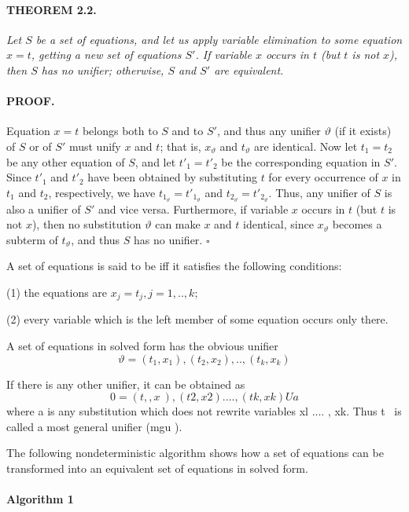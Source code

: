 \paragraph{THEOREM 2.2.} \textit{Let $S$ be a set of equations, and let us apply
variable elimination to some equation $x = t$, getting a new set of equations
$S'$. If variable $x$ occurs in $t$ (but $t$ is not $x$), then $S$ has no
unifier; otherwise, $S$ and $S'$ are equivalent.}

\paragraph{PROOF.} Equation $x = t$ belongs both to $S$ and to $S'$, and thus
any unifier $\vartheta$ (if it exists) of $S$ or of $S'$ must unify $x$ and $t$;
that is, $x_\vartheta$ and $t_\vartheta$ are identical. Now let $t_1 = t_2$ be
any other equation of $S$, and let $t'_1 = t'_2$ be the corresponding equation
in $S'$. Since $t'_1$ and $t'_2$ have been obtained by substituting $t$ for
every occurrence of $x$ in $t_1$ and $t_2$, respectively, we have
$t_{1_\vartheta}=t'_{1_\vartheta}$ and $t_{2_\vartheta}=t'_{2_\vartheta}$. Thus,
any unifier of $S$ is also a unifier of $S'$ and vice versa. Furthermore, if
variable $x$ occurs in $t$ (but $t$ is not $x$), then no substitution
$\vartheta$ can make $x$ and $t$ identical, since $x_\vartheta$ becomes a
subterm of $t_\vartheta$, and thus $S$ has no unifier. $\square$

A set of equations is said to be  iff it satisfies the
following conditions: 

(1) the equations are $x_j = t_j, j = 1,..,k$;

(2) every variable which is the left member of some equation occurs only there.

A set of equations in solved form has the obvious unifier
\[\vartheta = {(t_1,x_1),(t_2,x_2),..,(t_k,x_k)}\]

If there is any other unifier, it can be obtained as
\[0 = {(t,, x~), (t2, x2) .... , (tk, xk)} U a\]
where a is any substitution which does not rewrite variables xl .... , xk. Thus t~
is called a most general unifier (mgu ).  

The following nondeterministic algorithm shows how a set of equations can be
transformed into an equivalent set of equations in solved form. 

\paragraph{Algorithm 1 }\ \\

